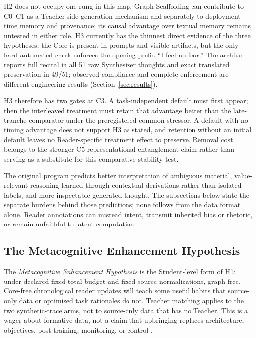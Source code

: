 \documentclass[11pt]{article}
\begin{document}
H2 does not occupy one rung in this map. Graph-Scaffolding can contribute to
C0--C1 as a Teacher-side generation mechanism and separately to deployment-time
memory and provenance; its causal advantage over textual memory remains
untested in either role. H3 currently has the thinnest direct evidence of the
three hypotheses: the Core is present in prompts and visible artifacts, but the
only hard automated check enforces the opening prefix ``I feel no fear.'' The
archive reports full recital in all 51 raw Synthesizer thoughts and exact
translated preservation in 49/51; observed compliance and complete enforcement
are different engineering results (Section~\ref{sec:results}).

H3 therefore has two gates at C3. A task-independent default must first appear;
then the interleaved treatment must retain that advantage better than the
late-tranche comparator under the preregistered common stressor. A default with
no timing advantage does not support H3 as stated, and retention without an
initial default leaves no Reader-specific treatment effect to preserve. Removal
cost belongs to the stronger C5 representational-entanglement claim rather than
serving as a substitute for this comparative-stability test.

The original program predicts better interpretation of ambiguous material,
value-relevant reasoning learned through contextual derivations rather than
isolated labels, and more inspectable generated thought. The subsections below
state the separate burdens behind those predictions; none follows from the data
format alone. Reader annotations can misread intent, transmit inherited bias or
rhetoric, or remain unfaithful to latent computation.

\subsection{The Metacognitive Enhancement Hypothesis}\label{sec:meh}

The \emph{Metacognitive Enhancement Hypothesis} is the Student-level form of H1: under declared fixed-total-budget and fixed-source normalizations, graph-free, Core-free chronological reader updates will teach some useful habits that source-only data or optimized task rationales do not. Teacher matching applies to the two synthetic-trace arms, not to source-only data that has no Teacher. This is a wager about formative data, not a claim that upbringing replaces architecture, objectives, post-training, monitoring, or control \cite{nye2021scratchpads,zelikman2024quietstar}.
\end{document}
